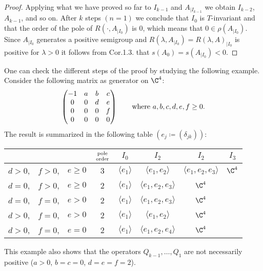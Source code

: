 \begin{proof}
	Applying what we have proved so far to $I_{k-1}$ and $A_{|I_{k-1}}$ we obtain $I_{k-2}$, $A_{k-1}$, and so on.
	After $k$ steps $(n=1)$ we conclude that $I_{0}$ is $T$-invariant and that the order of the pole of $R(\cdot,A_{|I_{0}})$ is $0$,
%	
%
	which means that $0 \in \rho(A_{|I_{0}})$.
	Since $A_{|I_{0}}$ generates a positive semigroup and $R(\lambda,A_{|I_{0}}) = R(\lambda,A)_{|I_{0}}$ is positive for $\lambda > 0$ it follows from Cor.1.3. that $s(A_{0}) = s(A_{|I_{0}}) < 0$.
\end{proof}
One can check the different steps of the proof by studying the following example. 
Consider the following matrix as generator on $\C^{4}$:
\[
\begin{pmatrix}
	-1 & a & b & c \\
	0 & 0 & d & e \\
	0 & 0 & 0 & f \\
	0 & 0 & 0 & 0
\end{pmatrix}
\quad \quad \text{where $ a,b,c,d,e,f \geq 0 $.} 
\]
The result is summarized in the following table $(e_{j} \coloneqq (\delta_{jk}))$:
\begin{table}[h!]\label{tab:table1}
\begin{center}
% 
\begin{tabular}{lll|c|cccc} %
		 &&& $\text{pole} \atop \text{order}$ & $I_0$ & $I_2$ & $I_2$ & $I_3$ \\[1ex]\hline
		$ d > 0 $, & $ f>0 $, &  $ e \ge 0 $ & 3 & $\langle e_1 \rangle$ &  $\langle e_1, e_2 \rangle$ &  $\langle e_1, e_2, e_3 \rangle$ &  $\C^4$\\
		$ d = 0 $, & $ f > 0 $, & $ e \ge 0 $ & 2 & $\langle e_1 \rangle$ &  $\langle e_1, e_2, e_3 \rangle$ &  $\C^4$ & \\	
		$ d = 0 $, & $ f = 0 $, & $ e > 0 $ & 2 & $\langle e_1 \rangle$ &  $\langle e_1, e_2, e_3 \rangle$ &  $\C^4$ & \\
		$ d > 0 $, & $ f = 0 $, & $ e > 0 $ & 2 & $\langle e_1 \rangle$ &  $\langle e_1, e_2 \rangle$ &  $\C^4$ & \\			
		$ d > 0 $, & $ f = 0 $, & $ e = 0 $ & 2 & $\langle e_1 \rangle$ &  $\langle e_1, e_2, e_4 \rangle$ &  $\C^4$ & \\	
\end{tabular}
\end{center}
\end{table}
This example also shows that the operators $Q_{k-1}, \ldots, Q_{1}$ are not necessarily positive (\eg $a>0$, $b=c=0$, $d=e=f=2$).

